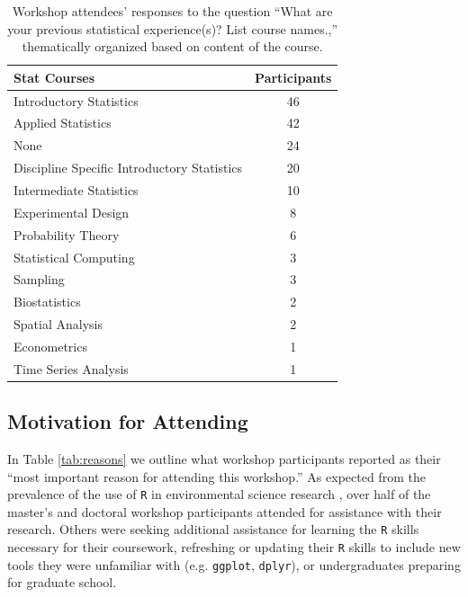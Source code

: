 \documentclass[12pt]{article}
\begin{document}
{
\begin{table}[h!]
    \centering
    \begin{tabular}{lc}
\hline
Stat Courses & Participants \\
\hline
Introductory Statistics & 46 \\
Applied Statistics & 42 \\
None & 24 \\
Discipline Specific Introductory Statistics & 20 \\
Intermediate Statistics & 10 \\
Experimental Design	& 8 \\
Probability Theory	& 6 \\
Statistical Computing & 3 \\
Sampling & 3 \\
Biostatistics & 2 \\
Spatial Analysis & 2 \\
Econometrics & 1 \\
Time Series Analysis & 1 \\
\hline
\end{tabular}
\caption{Workshop attendees' responses to the question ``What are your previous statistical experience(s)?  List course names.,'' thematically organized based on content of the course.}
    \label{tab:statistics}
\end{table}
}

\subsection{Motivation for Attending} 

\quad In Table \ref{tab:reasons} we outline what workshop participants reported as their ``most important reason for attending this workshop.'' As expected from the prevalence of the use of \texttt{R} in environmental science research \citep{Rpopular, mislan}, over half of the master's and doctoral workshop participants attended for assistance with their research. Others were seeking additional assistance for learning the \texttt{R} skills necessary for their coursework, refreshing or updating their \texttt{R} skills to include new tools they were unfamiliar with (e.g. \texttt{ggplot}, \texttt{dplyr}), or undergraduates preparing for graduate school.  
\end{document}
